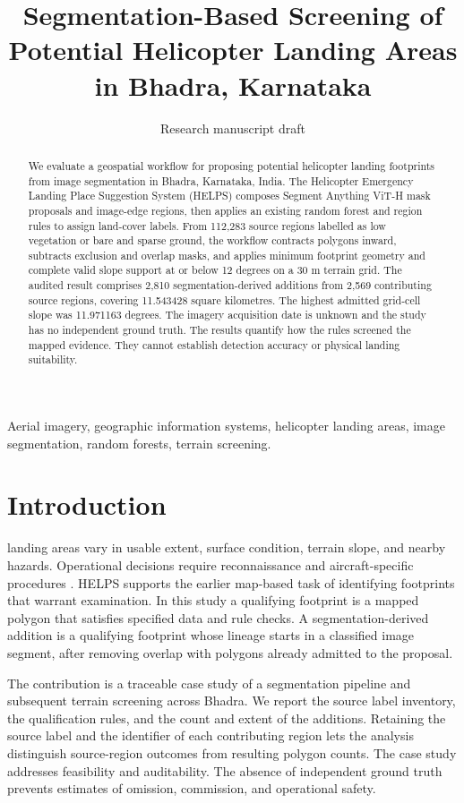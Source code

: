 \documentclass[journal]{IEEEtran}
\title{Segmentation-Based Screening of Potential Helicopter Landing Areas in Bhadra, Karnataka}
\author{Research manuscript draft}
\begin{document}
\maketitle
\begin{abstract}
We evaluate a geospatial workflow for proposing potential helicopter landing footprints from image segmentation in Bhadra, Karnataka, India. The Helicopter Emergency Landing Place Suggestion System (HELPS) composes Segment Anything ViT-H mask proposals and image-edge regions, then applies an existing random forest and region rules to assign land-cover labels. From 112,283 source regions labelled as low vegetation or bare and sparse ground, the workflow contracts polygons inward, subtracts exclusion and overlap masks, and applies minimum footprint geometry and complete valid slope support at or below 12 degrees on a 30 m terrain grid. The audited result comprises 2,810 segmentation-derived additions from 2,569 contributing source regions, covering 11.543428 square kilometres. The highest admitted grid-cell slope was 11.971163 degrees. The imagery acquisition date is unknown and the study has no independent ground truth. The results quantify how the rules screened the mapped evidence. They cannot establish detection accuracy or physical landing suitability.
\end{abstract}
\begin{IEEEkeywords}
Aerial imagery, geographic information systems, helicopter landing areas, image segmentation, random forests, terrain screening.
\end{IEEEkeywords}

\section{Introduction}
 landing areas vary in usable extent, surface condition, terrain slope, and nearby hazards. Operational decisions require reconnaissance and aircraft-specific procedures \cite{faa}. HELPS supports the earlier map-based task of identifying footprints that warrant examination. In this study a qualifying footprint is a mapped polygon that satisfies specified data and rule checks. A segmentation-derived addition is a qualifying footprint whose lineage starts in a classified image segment, after removing overlap with polygons already admitted to the proposal.

The contribution is a traceable case study of a segmentation pipeline and subsequent terrain screening across Bhadra. We report the source label inventory, the qualification rules, and the count and extent of the additions. Retaining the source label and the identifier of each contributing region lets the analysis distinguish source-region outcomes from resulting polygon counts. The case study addresses feasibility and auditability. The absence of independent ground truth prevents estimates of omission, commission, and operational safety.
\end{document}
